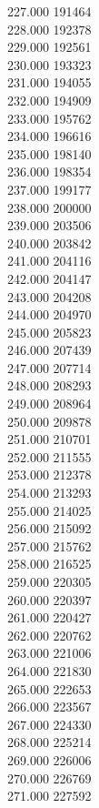 { 227.000	191464 \\
 228.000	192378 \\
 229.000	192561 \\
 230.000	193323 \\
 231.000	194055 \\
 232.000	194909 \\
 233.000	195762 \\
 234.000	196616 \\
 235.000	198140 \\
 236.000	198354 \\
 237.000	199177 \\
 238.000	200000 \\
 239.000	203506 \\
 240.000	203842 \\
 241.000	204116 \\
 242.000	204147 \\
 243.000	204208 \\
 244.000	204970 \\
 245.000	205823 \\
 246.000	207439 \\
 247.000	207714 \\
 248.000	208293 \\
 249.000	208964 \\
 250.000	209878 \\
 251.000	210701 \\
 252.000	211555 \\
 253.000	212378 \\
 254.000	213293 \\
 255.000	214025 \\
 256.000	215092 \\
 257.000	215762 \\
 258.000	216525 \\
 259.000	220305 \\
 260.000	220397 \\
 261.000	220427 \\
 262.000	220762 \\
 263.000	221006 \\
 264.000	221830 \\
 265.000	222653 \\
 266.000	223567 \\
 267.000	224330 \\
 268.000	225214 \\
 269.000	226006 \\
 270.000	226769 \\
 271.000	227592 \\
}

